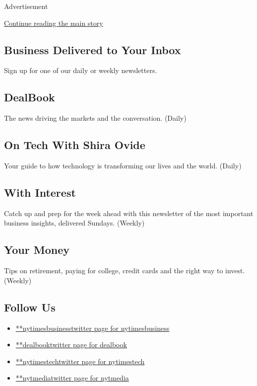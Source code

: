 Advertisement

\protect\hyperlink{after-mktg}{Continue reading the main story}

\hypertarget{business-delivered-to-your-inbox}{%
\subsection{Business Delivered to Your
Inbox}\label{business-delivered-to-your-inbox}}

Sign up for one of our daily or weekly newsletters.

\hypertarget{dealbook}{%
\subsection{DealBook}\label{dealbook}}

The news driving the markets and the conversation. (Daily)

\hypertarget{on-tech-with-shira-ovide}{%
\subsection{On Tech With Shira Ovide}\label{on-tech-with-shira-ovide}}

Your guide to how technology is transforming our lives and the world.
(Daily)

\hypertarget{with-interest}{%
\subsection{With Interest}\label{with-interest}}

Catch up and prep for the week ahead with this newsletter of the most
important business insights, delivered Sundays. (Weekly)

\hypertarget{your-money}{%
\subsection{Your Money}\label{your-money}}

Tips on retirement, paying for college, credit cards and the right way
to invest. (Weekly)

\hypertarget{follow-us}{%
\subsection{Follow Us}\label{follow-us}}

\begin{itemize}
\tightlist
\item
  \href{https://twitter.com/nytimesbusiness}{**nytimesbusinesstwitter
  page for nytimesbusiness}
\item
  \href{https://twitter.com/dealbook}{**dealbooktwitter page for
  dealbook}
\item
  \href{https://twitter.com/nytimestech}{**nytimestechtwitter page for
  nytimestech}
\item
  \href{https://twitter.com/nytmedia}{**nytmediatwitter page for
  nytmedia}
\end{itemize}

